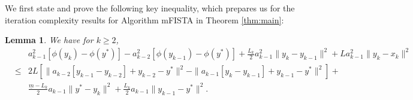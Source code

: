 \documentclass[11pt]{article}
\newtheorem{lemma}[thm]{Lemma}
\begin{document}
\noindent We first state and prove the following key inequality, which prepares us for the iteration complexity results for Algorithm mFISTA in Theorem \ref{thm:main}:
\begin{lemma}\label{lem:keyinequality}
We have for $k \geq 2$,
\begin{eqnarray}
& & a_{k-1}^2[\phi(y_{k}) - \phi(y^\ast)] - a_{k-2}^2 [\phi(y_{k-1}) - \phi(y^\ast)] + \frac{L_k}{2}a_{k-1}^2\|y_{k} - y_{k-1} \|^2 +  L a_{k-1}^2 \| y_{k} - {x}_{k} \|^2 \nonumber \\
& \leq &   2 L [\|a_{k-2}[ y_{k-1} - y_{k-2}]  + y_{k-2} - y^\ast \|^2 - \| a_{k-1}[ y_{k} - y_{k-1}]  + y_{k-1} - y^\ast \|^2] + \nonumber \\
&   & \frac{\underline{m} - L_k}{2} a_{k-1}  \| y^\ast - y_{k} \|^2 + \frac{L_k}{2} a_{k-1} \| y_{k-1} - y^\ast \|^2. \label{ineq:convexityfk7}
\end{eqnarray}
\end{lemma}
\end{document}
